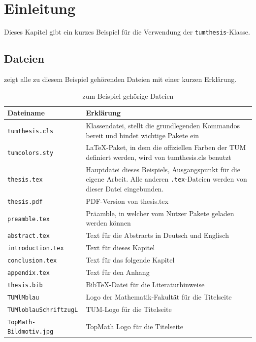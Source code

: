 \chapter{Einleitung}
\label{ch:introduction}
Dieses Kapitel gibt ein kurzes Beispiel für die Verwendung der
\texttt{tumthesis}-Klasse. 

\section{Dateien}
\label{sec:intro:dateien}

 zeigt alle zu diesem Beispiel
gehörenden Dateien mit einer kurzen Erklärung.

\begin{table}[htb]
  \centering
  \begin{tabular}{lp{10cm}} 
    \toprule
    \textbf{Dateiname} & \textbf{Erklärung} \\ \midrule
    \texttt{tumthesis.cls} & Klassendatei, stellt die grundlegenden Kommandos
    bereit und bindet wichtige Pakete ein\\
    \texttt{tumcolors.sty} & \LaTeX-Paket, in dem die offiziellen Farben der TUM
    definiert werden, wird von tumthesis.cls benutzt\\
    \texttt{thesis.tex} & Hauptdatei dieses Beispiels, Ausgangspunkt für die
    eigene Arbeit. Alle anderen \texttt{.tex}-Dateien werden von dieser Datei
    eingebunden.\\
    \texttt{thesis.pdf} & PDF-Version von thesis.tex\\
		\texttt{preamble.tex} & Präamble, in welcher vom Nutzer Pakete geladen werden können\\
    \texttt{abstract.tex} & Text für die Abstracts in Deutsch und Englisch\\
    \texttt{introduction.tex} & Text für dieses Kapitel\\
    \texttt{conclusion.tex} & Text für das folgende Kapitel\\
    \texttt{appendix.tex} & Text für den Anhang\\
    \texttt{thesis.bib} & Bib\TeX-Datei für die Literaturhinweise\\
    \texttt{TUMlMblau} & Logo der Mathematik-Fakultät für die Titelseite\\
    \texttt{TUMloblauSchriftzugL} & TUM-Logo für die Titelseite\\
		\texttt{TopMath-Bildmotiv.jpg} & TopMath Logo für die Titelseite\\
    \bottomrule
  \end{tabular} 
  \caption{zum Beispiel gehörige Dateien}
  \label{tab:intro:dateien}
\end{table}

